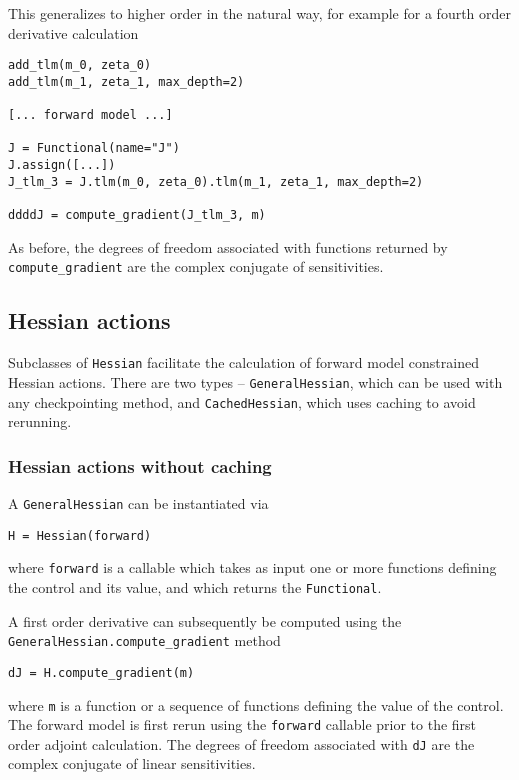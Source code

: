 \documentclass[11pt]{article}
\begin{document}
This generalizes to higher order in the natural way, for example for a fourth
order derivative calculation
\begin{lstlisting}
add_tlm(m_0, zeta_0)
add_tlm(m_1, zeta_1, max_depth=2)

[... forward model ...]

J = Functional(name="J")
J.assign([...])
J_tlm_3 = J.tlm(m_0, zeta_0).tlm(m_1, zeta_1, max_depth=2)

ddddJ = compute_gradient(J_tlm_3, m)
\end{lstlisting}

As before, the degrees of freedom associated with functions returned by
\texttt{compute\_gradient} are the complex conjugate of sensitivities.

\subsection{Hessian actions}\label{sect:Hessian}

Subclasses of \texttt{Hessian} facilitate the calculation of forward model
constrained Hessian actions. There are two types -- \texttt{GeneralHessian},
which can be used with any checkpointing method, and \texttt{CachedHessian},
which uses caching to avoid rerunning.

\subsubsection{Hessian actions without caching}

A \texttt{GeneralHessian} can be instantiated via
\begin{lstlisting}
H = Hessian(forward)
\end{lstlisting}
where \texttt{forward} is a callable which takes as input one or more functions
defining the control and its value, and which returns the \texttt{Functional}.

A first order derivative can subsequently be computed using the
\texttt{GeneralHessian.compute\_gradient} method
\begin{lstlisting}
dJ = H.compute_gradient(m)
\end{lstlisting}
where \texttt{m} is a function or a sequence of functions defining the value of
the control. The forward model is first rerun using the \texttt{forward}
callable prior to the first order adjoint calculation. The degrees of
freedom associated with \texttt{dJ} are the complex conjugate of linear
sensitivities.
\end{document}
